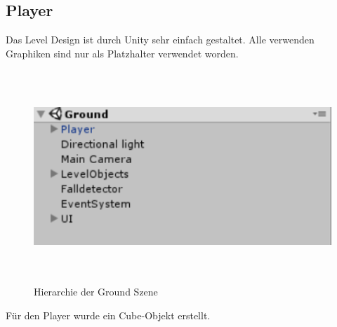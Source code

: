 \subsection{Player}
Das Level Design ist durch Unity sehr einfach gestaltet. Alle verwenden Graphiken sind nur als Platzhalter verwendet worden.
\begin{figure}[H]
	\includegraphics[height=8cm]{images/Ground.png}
	\caption{Hierarchie der Ground Szene}
\end{figure}
Für den Player wurde ein Cube-Objekt erstellt.
